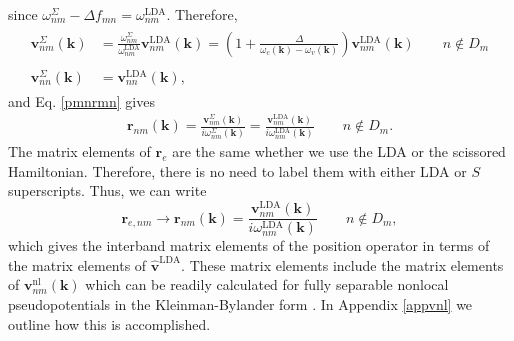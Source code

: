 since $\omega^\Sigma_{nm}-\Delta f_{mn}=\omega^{\mathrm{LDA}}_{nm}$. Therefore,
\begin{align}\label{chon.9}
\begin{split}
\mathbf{v}^\Sigma_{nm}(\mathbf{k}) &=
\frac{\omega^\Sigma_{nm}}{\omega^{\mathrm{LDA}}_{nm}}
\mathbf{v}^\mathrm{LDA}_{nm}(\mathbf{k})
= \left(
1 + \frac{\Delta}{\omega_c(\mathbf{k})-\omega_v(\mathbf{k})}
\right)
\mathbf{v}^\mathrm{LDA}_{nm}(\mathbf{k})\qquad n\notin D_{m}\\\\
\mathbf{v}^\Sigma_{nn}(\mathbf{k}) &= \mathbf{v}^\mathrm{LDA}_{nn}(\mathbf{k}),
\end{split}
\end{align} 
and Eq. \eqref{pmnrmn} gives
\begin{align}\label{chon.10}
\mathbf{r}_{nm}(\mathbf{k})
= \frac{\mathbf{v}^\Sigma_{nm}(\mathbf{k})}{i\omega^\Sigma_{nm}(\mathbf{k})}
= \frac{\mathbf{v}^\mathrm{LDA}_{nm}(\mathbf{k})}
{i\omega^{\mathrm{LDA}}_{nm}(\mathbf{k})} \qquad n\notin D_{m}.
\end{align}
The matrix elements of $\mathbf{r}_{e}$ are the same whether we use the LDA or
the scissored Hamiltonian. Therefore, there is no need to label them with either
LDA or $S$ superscripts. Thus, we can write
\begin{equation}\label{chon.98}
\mathbf{r}_{e,nm}\to\mathbf{r}_{nm}(\mathbf{k}) =
\frac{\mathbf{v}^\mathrm{LDA}_{nm}(\mathbf{k})}
     {i\omega^{\mathrm{LDA}}_{nm}(\mathbf{k})}
\qquad n\notin D_{m},
\end{equation}   
which gives the interband matrix elements of the position operator in terms of
the matrix elements of $\hat{\mathbf{v}}^\mathrm{LDA}$. These matrix elements
include the matrix elements of $\mathbf{v}^{\mathrm{nl}}_{nm}(\mathbf{k})$ which
can be readily calculated for fully separable nonlocal pseudopotentials in the
Kleinman-Bylander form \cite{mottaCMS10, kleinmanPRL82, adolphPRB96}. In
Appendix \ref{appvnl} we outline how this is accomplished.




